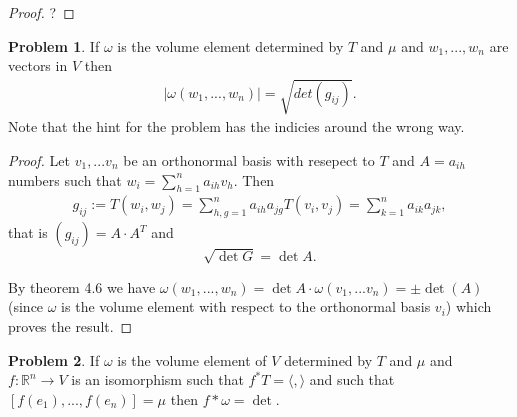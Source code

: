 \documentclass[20pt]{article}
\theoremstyle{plain}
\theoremstyle{definition}
\newtheorem*{problem}{Problem}
\newcommand{\reals}{\mathbb{R}}
\begin{document}
  \begin{proof}
    \color{ForestGreen}?
  \end{proof}


  \begin{problem}{4.3}
    If $\omega$ is the volume element determined by $T$ and $\mu$ and $w_1, ..., w_n$ are vectors in $V$ then 
    \begin{align}
      |\omega(w_1, ..., w_n)| = \sqrt{det(g_{ij})}.
    \end{align}    
    Note that the hint for the problem has the indicies around the wrong way.
  \end{problem}
  \begin{proof}
    Let $v_1, ...v_n$ be an orthonormal basis with resepect to $T$ and $A = a_{ih}$ numbers such that 
    $w_i = \sum_{h=1}^n a_{ih}v_h$.
    Then 
    \begin{align}
      g_{ij} := T(w_i, w_j) = \sum_{h,g=1}^n a_{ih}a_{jg}T(v_i, v_j) = \sum_{k=1}^n a_{ik}a_{jk},
    \end{align}
    that is $(g_{ij}) = A\cdot A^T$ and
    $$\sqrt{\det G} = \det A.$$

    By theorem 4.6 we have 
    $ \omega(w_1, ..., w_n) = \det A \cdot \omega(v_1, ...v_n) = \pm \det(A)$
    (since $\omega$ is the volume element with respect to the orthonormal basis $v_i$) which proves the result.
  \end{proof}












































\begin{problem}{4.4}
  If $\omega$ is the volume element of $V$ determined by $T$ and $\mu$ and
  $f: \reals^n \to V$ is an isomorphism such that $f^*T = \langle, \rangle$ and such that 
  $[f(e_1), ..., f(e_n)] = \mu$ then $f*\omega = \det.$
\end{problem}
\end{document}
